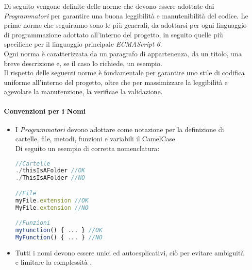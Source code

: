Di seguito vengono definite delle norme che devono essere adottate dai \textit{Programmatori} per garantire una buona leggibilità  e manutenibilità  del codice. Le prime norme che seguiranno sono le più generali, da adottarsi per ogni linguaggio di programmazione adottato all'interno del progetto, in seguito quelle più specifiche per il linguaggio principale \textit{ECMAScript 6}\glossario.\\
Ogni norma è caratterizzata da un paragrafo di appartenenza, da un titolo, una breve descrizione e, se il caso lo richiede, un esempio.\\
Il rispetto delle seguenti norme è fondamentale per garantire uno stile di codifica uniforme all'interno del progetto, oltre che per massimizzare la leggibilità  e agevolare la manutenzione, la verifica\glossario e la validazione\glossario.

\paragraph{Convenzioni per i Nomi} \label{Nomi}
\begin{itemize}	
	\item I \textit{Programmatori} devono adottare come notazione per la definizione di cartelle, file, metodi, funzioni e variabili il CamelCase\glossario.\\
	Di seguito un esempio di corretta nomenclatura:
	\begin{lstlisting}[language=JavaScript]
//Cartelle 
./thisIsAFolder	//OK
./ThisIsAFolder //NO

//File
myFile.extension //OK
MyFile.extension //NO

//Funzioni
myFunction() { ... } //OK
MyFunction() { ... } //NO
	\end{lstlisting}

	\item Tutti i nomi devono essere unici ed autoesplicativi, ciò per evitare ambiguità  e limitare la complessità .
\end{itemize}
